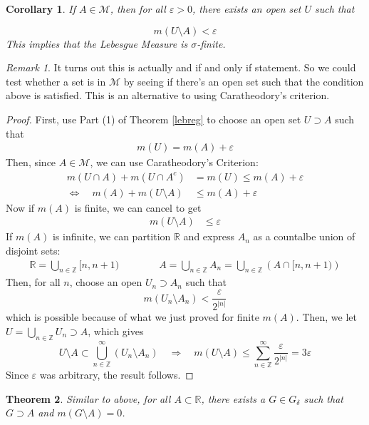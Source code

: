 \documentclass[12pt]{article}
\theoremstyle{plain}
\newtheorem{thm}{Theorem}[subsection]
\newtheorem{cor}[thm]{Corollary}
\theoremstyle{definition}
\theoremstyle{remark}
\newtheorem*{rmk}{Remark}
\begin{document}
\begin{cor}
If $A\in\mathscr{M}$, then for all $\varepsilon>0$, there exists an open set $U$ such that 

\[
    m(U\setminus A) < \varepsilon
\]
This implies that the Lebesgue Measure is \emph{$\sigma$-finite}.
\end{cor}
\begin{rmk}
It turns out this is actually and if and only if statement. So we could test whether a set is in $\mathscr{M}$ by seeing if there's an open set such that the condition above is satisfied. This is an alternative to using Caratheodory's criterion.
\end{rmk}
\begin{proof}
First, use Part (1) of Theorem \ref{lebreg} to choose an open set $U \supset A$ such that  
\begin{align*}
    m(U) = m(A) + \varepsilon
\end{align*}
Then, since $A\in\mathscr{M}$, we can use Caratheodory's Criterion:
\begin{align*}
    m(U\cap A) + m(U\cap A^c) &= m(U) \leq m(A) 
    +\varepsilon \\
    \Leftrightarrow  \quad
    m(A) + m(U\setminus A) &\leq m(A) +\varepsilon
\end{align*}
Now if $m(A)$ is finite, we can cancel to get 
\begin{align*}
    m(U\setminus A) &\leq \varepsilon
\end{align*}
If $m(A)$ is infinite, we can partition $\mathbb{R}$ and express $A_n$ as a countalbe union of disjoint sets:
\begin{align*}
    \mathbb{R} = \bigcup_{n\in\mathbb{Z}} [n,n+1)
    \qquad \qquad 
    A = \bigcup_{n\in\mathbb{Z}} A_n = 
    \bigcup_{n\in\mathbb{Z}} \left(A \cap [n,n+1)\right)
\end{align*}
Then, for all $n$, choose an open $U_n\supset A_n$ such that
\[
    m(U_n \setminus A_n) < \frac{\varepsilon}{2^{|n|}}
\]
which is possible because of what we just proved for finite $m(A)$. Then, we let $U = \bigcup_{n\in\mathbb{Z}} U_n \supset A$, which gives
\[
    U\setminus A \subset \bigcup^\infty_{n\in\mathbb{Z}}
    \left(U_n \setminus A_n \right)
    \quad \Rightarrow\quad
    m(U\setminus A) \leq \sum^\infty_{n\in\mathbb{Z}}
    \frac{\varepsilon}{2^{|n|}} = 3\varepsilon
\]
Since $\varepsilon$ was arbitrary, the result follows.
\end{proof}


\begin{thm} 
Similar to above, for all $A\subset\mathbb{R}$, there exists a $G \in G_\delta$ such that $G\supset A$ and $m(G\setminus A) = 0$.
\end{thm}
\end{document}
